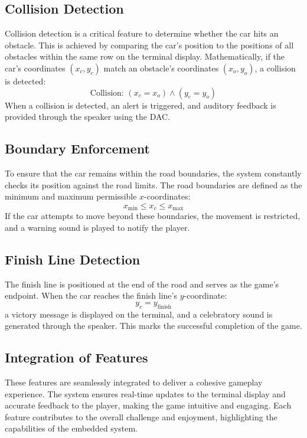 \documentclass[conference]{IEEEtran}
\begin{document}
\subsection{Collision Detection}
Collision detection is a critical feature to determine whether the car hits an obstacle. This is achieved by comparing the car's position to the positions of all obstacles within the same row on the terminal display. Mathematically, if the car's coordinates $(x_c, y_c)$ match an obstacle's coordinates $(x_o, y_o)$, a collision is detected:
\begin{equation}
\text{Collision: } (x_c = x_o) \land (y_c = y_o)
\end{equation}
When a collision is detected, an alert is triggered, and auditory feedback is provided through the speaker using the DAC.

\subsection{Boundary Enforcement}
To ensure that the car remains within the road boundaries, the system constantly checks its position against the road limits. The road boundaries are defined as the minimum and maximum permissible $x$-coordinates:
\begin{equation}
x_{\text{min}} \leq x_c \leq x_{\text{max}}
\end{equation}
If the car attempts to move beyond these boundaries, the movement is restricted, and a warning sound is played to notify the player.

\subsection{Finish Line Detection}
The finish line is positioned at the end of the road and serves as the game's endpoint. When the car reaches the finish line's $y$-coordinate:
\begin{equation}
y_c = y_{\text{finish}}
\end{equation}
a victory message is displayed on the terminal, and a celebratory sound is generated through the speaker. This marks the successful completion of the game.

\subsection{Integration of Features}
These features are seamlessly integrated to deliver a cohesive gameplay experience. The system ensures real-time updates to the terminal display and accurate feedback to the player, making the game intuitive and engaging. Each feature contributes to the overall challenge and enjoyment, highlighting the capabilities of the embedded system.
\end{document}
